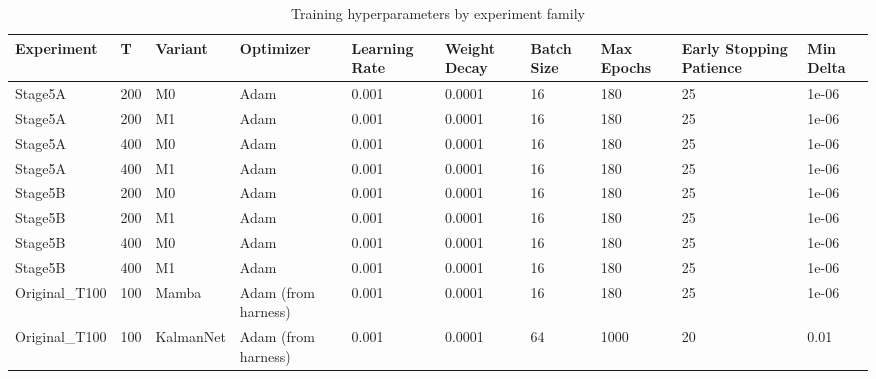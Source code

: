 \begin{table}[t]
\centering
\caption{Training hyperparameters by experiment family}
\label{tab:training}
\scriptsize
\begin{tabular}{llllllllll}
\hline
Experiment & T & Variant & Optimizer & Learning Rate & Weight Decay & Batch Size & Max Epochs & Early Stopping Patience & Min Delta \\
\hline
Stage5A & 200 & M0 & Adam & 0.001 & 0.0001 & 16 & 180 & 25 & 1e-06 \\
Stage5A & 200 & M1 & Adam & 0.001 & 0.0001 & 16 & 180 & 25 & 1e-06 \\
Stage5A & 400 & M0 & Adam & 0.001 & 0.0001 & 16 & 180 & 25 & 1e-06 \\
Stage5A & 400 & M1 & Adam & 0.001 & 0.0001 & 16 & 180 & 25 & 1e-06 \\
Stage5B & 200 & M0 & Adam & 0.001 & 0.0001 & 16 & 180 & 25 & 1e-06 \\
Stage5B & 200 & M1 & Adam & 0.001 & 0.0001 & 16 & 180 & 25 & 1e-06 \\
Stage5B & 400 & M0 & Adam & 0.001 & 0.0001 & 16 & 180 & 25 & 1e-06 \\
Stage5B & 400 & M1 & Adam & 0.001 & 0.0001 & 16 & 180 & 25 & 1e-06 \\
Original\_T100 & 100 & Mamba & Adam (from harness) & 0.001 & 0.0001 & 16 & 180 & 25 & 1e-06 \\
Original\_T100 & 100 & KalmanNet & Adam (from harness) & 0.001 & 0.0001 & 64 & 1000 & 20 & 0.01 \\
\hline
\end{tabular}
\end{table}
